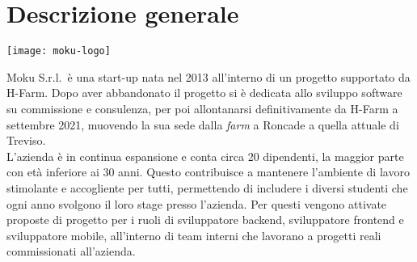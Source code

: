 \section{Descrizione generale}

\begin{center}
	\texttt{[image: moku-logo]}
\end{center}

\noindent Moku S.r.l.\ è una start-up nata nel 2013 all'interno di un progetto supportato da H-Farm. Dopo aver abbandonato il progetto si è dedicata allo sviluppo software su commissione e consulenza, per poi allontanarsi definitivamente da H-Farm a settembre 2021, muovendo la sua sede dalla \emph{farm} a Roncade a quella attuale di Treviso. \\
L'azienda è in continua espansione e conta circa 20 dipendenti, la maggior parte con età inferiore ai 30 anni. Questo contribuisce a mantenere l'ambiente di lavoro stimolante e accogliente per tutti, permettendo di includere i diversi studenti che ogni anno svolgono il loro stage presso l'azienda. Per questi vengono attivate proposte di progetto per i ruoli di sviluppatore backend, sviluppatore frontend e sviluppatore mobile, all'interno di team interni che lavorano a progetti reali commissionati all'azienda.

